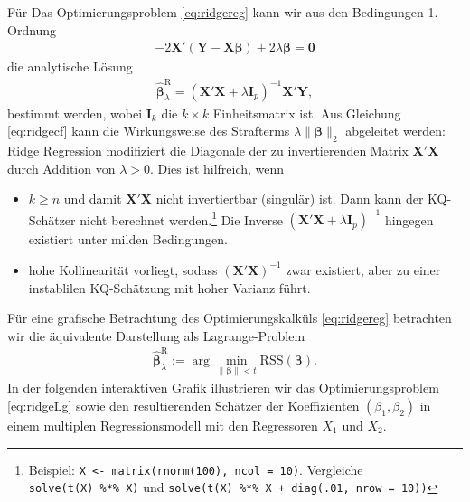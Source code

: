 \documentclass[
  a4paper,
  DIV=11,
  oneside]{scrreprt}
\begin{document}
Für Das Optimierungsproblem \eqref{eq:ridgereg} kann wir aus den
Bedingungen 1. Ordnung \begin{align}
  -2\boldsymbol{X}'(\boldsymbol{Y} - \boldsymbol{X}\boldsymbol{\beta}) + 2\lambda\boldsymbol{\beta} = \boldsymbol{0}
\end{align} die analytische Lösung \begin{align}
  \widehat{\boldsymbol{\beta}}^{\mathrm{R}}_\lambda = (\boldsymbol{X}'\boldsymbol{X} + \lambda\boldsymbol{I}_p)^{-1}\boldsymbol{X}'\boldsymbol{Y},\label{eq:ridgecf}
\end{align} bestimmt werden, wobei \(\boldsymbol{I}_k\) die
\(k\times k\) Einheitsmatrix ist. Aus Gleichung \eqref{eq:ridgecf} kann
die Wirkungsweise des Strafterms
\(\lambda \lVert\boldsymbol{\beta}\rVert_2\) abgeleitet werden: Ridge
Regression modifiziert die Diagonale der zu invertierenden Matrix
\(\boldsymbol{X}'\boldsymbol{X}\) durch Addition von \(\lambda>0\). Dies
ist hilfreich, wenn

\begin{itemize}
\item
  \(k\geq n\) und damit \(\boldsymbol{X}'\boldsymbol{X}\) nicht
  invertiertbar (singulär) ist. Dann kann der KQ-Schätzer nicht
  berechnet werden.\footnote{Beispiel:
    \texttt{X\ \textless{}-\ matrix(rnorm(100),\ ncol\ =\ 10)}.
    Vergleiche \texttt{solve(t(X)\ \%*\%\ X)} und
    \texttt{solve(t(X)\ \%*\%\ X\ +\ diag(.01,\ nrow\ =\ 10))}} Die
  Inverse
  \((\boldsymbol{X}'\boldsymbol{X} + \lambda\boldsymbol{I}_p)^{-1}\)
  hingegen existiert unter milden Bedingungen.
\item
  hohe Kollinearität vorliegt, sodass
  \((\boldsymbol{X}'\boldsymbol{X})^{-1}\) zwar existiert, aber zu einer
  instablilen KQ-Schätzung mit hoher Varianz führt.
\end{itemize}

Für eine grafische Betrachtung des Optimierungskalküls
\eqref{eq:ridgereg} betrachten wir die äquivalente Darstellung als
Lagrange-Problem \begin{align}
  \widehat{\boldsymbol{\beta}}^{\mathrm{R}}_\lambda := \arg\min_{\lVert\boldsymbol{\beta}\rVert<t}\mathrm{RSS}(\boldsymbol{\beta}).\label{eq:ridgeLg}
\end{align} In der folgenden interaktiven Grafik illustrieren wir das
Optimierungsproblem \eqref{eq:ridgeLg} sowie den resultierenden Schätzer
der Koeffizienten \((\beta_1, \beta_2)\) in einem multiplen
Regressionsmodell mit den Regressoren \(X_1\) und \(X_2\).
\end{document}
